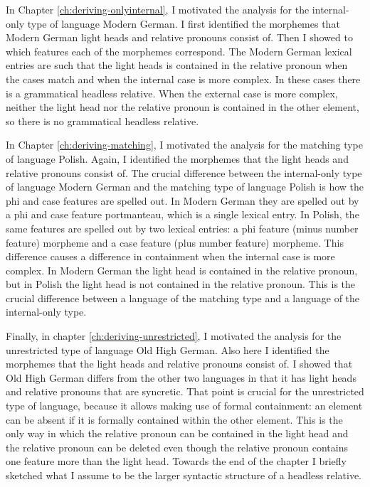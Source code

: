 In Chapter \ref{ch:deriving-onlyinternal}, I motivated the analysis for the internal-only type of language Modern German. I first identified the morphemes that Modern German light heads and relative pronouns consist of. Then I showed to which features each of the morphemes correspond. The Modern German lexical entries are such that the light heads is contained in the relative pronoun when the cases match and when the internal case is more complex. In these cases there is a grammatical headless relative. When the external case is more complex, neither the light head nor the relative pronoun is contained in the other element, so there is no grammatical headless relative.

In Chapter \ref{ch:deriving-matching}, I motivated the analysis for the matching type of language Polish. Again, I identified the morphemes that the light heads and relative pronouns consist of. The crucial difference between the internal-only type of language Modern German and the matching type of language Polish is how the phi and case features are spelled out. In Modern German they are spelled out by a phi and case feature portmanteau, which is a single lexical entry. In Polish, the same features are spelled out by two lexical entries: a phi feature (minus number feature) morpheme and a case feature (plus number feature) morpheme. This difference causes a difference in containment when the internal case is more complex. In Modern German the light head is contained in the relative pronoun, but in Polish the light head is not contained in the relative pronoun. This is the crucial difference between a language of the matching type and a language of the internal-only type.

Finally, in chapter \ref{ch:deriving-unrestricted}, I motivated the analysis for the unrestricted type of language Old High German. Also here I identified the morphemes that the light heads and relative pronouns consist of. I showed that Old High German differs from the other two languages in that it has light heads and relative pronouns that are syncretic. That point is crucial for the unrestricted type of language, because it allows making use of formal containment: an element can be absent if it is formally contained within the other element. This is the only way in which the relative pronoun can be contained in the light head and the relative pronoun can be deleted even though the relative pronoun contains one feature more than the light head. Towards the end of the chapter I briefly sketched what I assume to be the larger syntactic structure of a headless relative.


